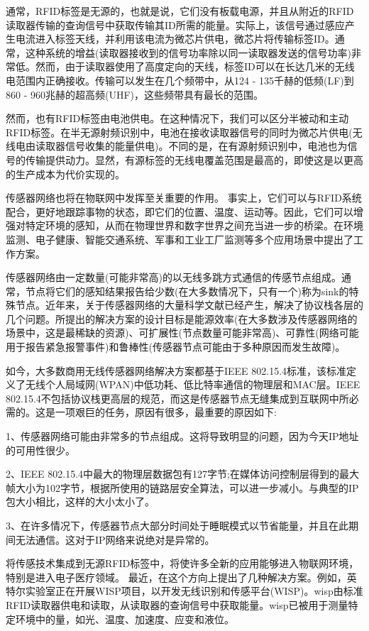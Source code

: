 \documentclass[12pt,a4paper]{article}%
\begin{document}
通常，RFID标签是无源的，也就是说，它们没有板载电源，并且从附近的RFID读取器传输的查询信号中获取传输其ID所需的能量。实际上，该信号通过感应产生电流进入标签天线，并利用该电流为微芯片供电，微芯片将传输标签ID。通常，这种系统的增益(读取器接收到的信号功率除以同一读取器发送的信号功率)非常低。然而，由于读取器使用了高度定向的天线，标签ID可以在长达几米的无线电范围内正确接收。传输可以发生在几个频带中，从124 - 135千赫的低频(LF)到860 - 960兆赫的超高频(UHF)，这些频带具有最长的范围。

然而，也有RFID标签由电池供电。在这种情况下，我们可以区分半被动和主动RFID标签。在半无源射频识别中，电池在接收读取器信号的同时为微芯片供电(无线电由读取器信号收集的能量供电)。不同的是，在有源射频识别中，电池也为信号的传输提供动力。显然，有源标签的无线电覆盖范围是最高的，即使这是以更高的生产成本为代价实现的。

传感器网络也将在物联网中发挥至关重要的作用。
事实上，它们可以与RFID系统配合，更好地跟踪事物的状态，即它们的位置、温度、运动等。因此，它们可以增强对特定环境的感知，从而在物理世界和数字世界之间充当进一步的桥梁。在环境监测、电子健康、智能交通系统、军事和工业工厂监测等多个应用场景中提出了工作方案。

传感器网络由一定数量(可能非常高)的以无线多跳方式通信的传感节点组成。通常，节点将它们的感知结果报告给少数(在大多数情况下，只有一个)称为sink的特殊节点。近年来，关于传感器网络的大量科学文献已经产生，解决了协议栈各层的几个问题。所提出的解决方案的设计目标是能源效率(在大多数涉及传感器网络的场景中，这是最稀缺的资源)、可扩展性(节点数量可能非常高)、可靠性(网络可能用于报告紧急报警事件)和鲁棒性(传感器节点可能由于多种原因而发生故障)。

如今，大多数商用无线传感器网络解决方案都基于IEEE 802.15.4标准，该标准定义了无线个人局域网(WPAN)中低功耗、低比特率通信的物理层和MAC层。IEEE 802.15.4不包括协议栈更高层的规范，而这是传感器节点无缝集成到互联网中所必需的。这是一项艰巨的任务，原因有很多，最重要的原因如下:

1、传感器网络可能由非常多的节点组成。这将导致明显的问题，因为今天IP地址的可用性很少。

2、IEEE 802.15.4中最大的物理层数据包有127字节;在媒体访问控制层得到的最大帧大小为102字节，根据所使用的链路层安全算法，可以进一步减小。与典型的IP包大小相比，这样的大小太小了。

3、在许多情况下，传感器节点大部分时间处于睡眠模式以节省能量，并且在此期间无法通信。这对于IP网络来说绝对是异常的。

将传感技术集成到无源RFID标签中，将使许多全新的应用能够进入物联网环境，特别是进入电子医疗领域。
最近，在这个方向上提出了几种解决方案。例如，英特尔实验室正在开展WISP项目，以开发无线识别和传感平台(WISP)。wisp由标准RFID读取器供电和读取，从读取器的查询信号中获取能量。wisp已被用于测量特定环境中的量，如光、温度、加速度、应变和液位。
\end{document}
